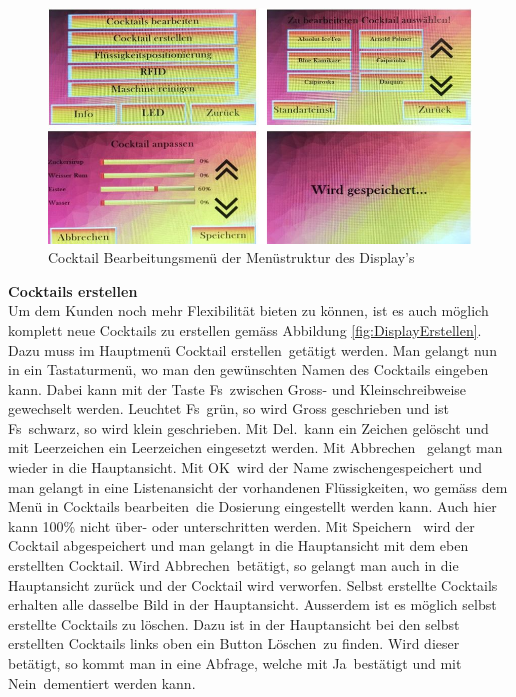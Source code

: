 \begin{figure}[H]
	\centering
	\includegraphics[width=\textwidth]{graphics/DisplayBearbeiten}
	\caption{Cocktail Bearbeitungsmenü der Menüstruktur des Display's}
	\label{fig:DisplayBearbeiten}
\end{figure}

\textbf{Cocktails erstellen}\\
Um dem Kunden noch mehr Flexibilität bieten zu können, ist es auch möglich komplett neue Cocktails zu erstellen gemäss Abbildung \ref{fig:DisplayErstellen}. Dazu muss im Hauptmenü \flqq Cocktail erstellen\frqq~getätigt werden. Man gelangt nun in ein Tastaturmenü, wo man den gewünschten Namen des Cocktails eingeben kann. Dabei kann mit der Taste \flqq Fs\frqq~zwischen Gross- und Kleinschreibweise gewechselt werden. Leuchtet \flqq Fs\frqq~grün, so wird Gross geschrieben und ist \flqq Fs\frqq~schwarz, so wird klein geschrieben. Mit \flqq Del.\frqq~kann ein Zeichen gelöscht und mit Leerzeichen ein Leerzeichen eingesetzt werden. Mit \flqq Abbrechen\frqq~ gelangt man wieder in die Hauptansicht. Mit \flqq OK\frqq~wird der Name zwischengespeichert und man gelangt in eine Listenansicht der vorhandenen Flüssigkeiten, wo gemäss dem Menü in \flqq Cocktails bearbeiten\frqq~die Dosierung eingestellt werden kann.  Auch hier kann 100\% nicht über- oder unterschritten werden. Mit \flqq Speichern\frqq~ wird der Cocktail abgespeichert und man gelangt in die Hauptansicht mit dem eben erstellten Cocktail. Wird \flqq Abbrechen\frqq~betätigt, so gelangt man auch in die Hauptansicht zurück und der Cocktail wird verworfen. Selbst erstellte Cocktails erhalten alle dasselbe Bild in der Hauptansicht. Ausserdem ist es möglich selbst erstellte Cocktails zu löschen. Dazu ist in der Hauptansicht bei den selbst erstellten Cocktails links oben ein Button \flqq Löschen\frqq~zu finden. Wird dieser betätigt, so kommt man in eine Abfrage, welche mit \flqq Ja\frqq~bestätigt und mit \flqq Nein\frqq~dementiert werden kann. 


